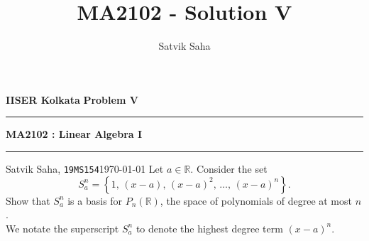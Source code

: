 \documentclass[10pt]{article}
\title{MA2102 - Solution V}
\author{Satvik Saha}
\date{}
\begin{document}
        \par\textbf{IISER Kolkata} \hfill \textbf{Problem V}
        \vspace{3pt}
        \hrule
        \vspace{3pt}
        \begin{center}
                \LARGE{\textbf{MA2102 : Linear Algebra I}}
        \end{center}
        \vspace{3pt}
        \hrule
        \vspace{3pt}
        Satvik Saha, \texttt{19MS154}\hfill\today
        \vspace{20pt}
        Let $a \in \mathbb{R}$. Consider the set
        \[
                S_a^n = \left\{ 1,\, (x - a),\, (x - a)^2,\, \dots,\, (x - a)^n \right\}.
        \]
        Show that $S_a^n$ is a basis for $P_n(\mathbb{R})$, the space of polynomials of degree at most $n$. \\

        We notate the superscript $S_a^n$ to denote the highest degree term $(x - a)^n$.
\end{document}
